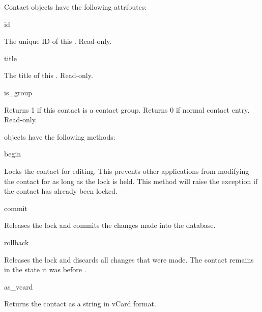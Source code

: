 \begin{classdesc*}{Contact}
 objects have the following attributes:

\begin{memberdesc}[Contact]{id}

The unique ID of this . Read-only.

\end{memberdesc}

\begin{memberdesc}[Contact]{title}

The title of this . Read-only.

\end{memberdesc}

\begin{memberdesc}[Contact]{is_group}

Returns 1 if this contact is a contact group. Returns 0 if normal contact entry. Read-only.

\end{memberdesc}

 objects have the following methods:

\begin{methoddesc}[Contact]{begin}{}

Locks the contact for editing. This prevents other applications from 
modifying the contact for as long as the lock is held. This method will 
raise the exception  if the contact has already been 
locked.

\end{methoddesc}

\begin{methoddesc}[Contact]{commit}{}

Releases the lock and commits the changes made into the database.

\end{methoddesc}

\begin{methoddesc}[Contact]{rollback}{}

Releases the lock and discards all changes that were made. The contact 
remains in the state it was before .

\end{methoddesc}

\begin{methoddesc}[Contact]{as_vcard}{}

Returns the contact as a string in vCard format.


\end{methoddesc}
\end{classdesc*}
